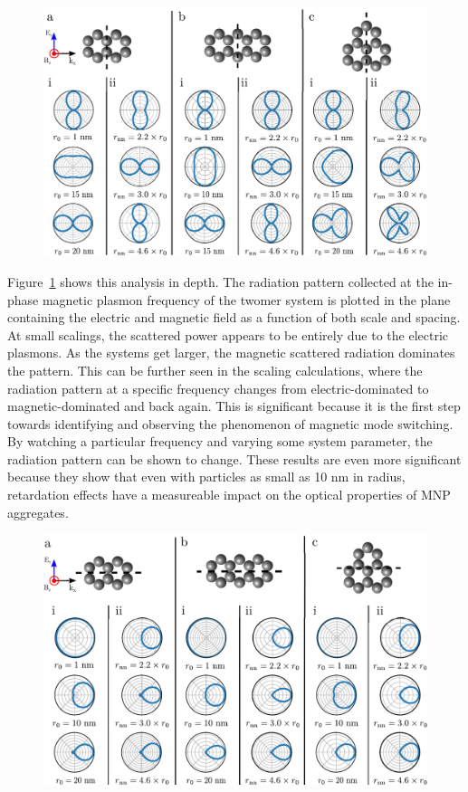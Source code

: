 \documentclass[journal=apchd5,manuscript=article]{achemso}
\begin{document}
\begin{figure}
\includegraphics[width=5in]{polar_plots_yz.pdf}
\label{polar_plots_yz}
\end{figure}

Figure~\ref{polar_plots_yz} shows this analysis in depth. The radiation pattern collected at the in-phase magnetic plasmon frequency of the twomer system is plotted in the plane containing the electric and magnetic field as a function of both scale and spacing. At small scalings, the scattered power appears to be entirely due to the electric plasmons. As the systems get larger, the magnetic scattered radiation dominates the pattern. This can be further seen in the scaling calculations, where the radiation pattern at a specific frequency changes from electric-dominated to magnetic-dominated and back again. This is significant because it is the first step towards identifying and observing the phenomenon of magnetic mode switching. By watching a particular frequency and varying some system parameter, the radiation pattern can be shown to change. These results are even more significant because they show that even with particles as small as 10 nm in radius, retardation effects have a measureable impact on the optical properties of MNP aggregates.

\begin{figure}
\includegraphics[width=5in]{beaming.pdf}
\label{polar_plots_xz}
\end{figure}
\end{document}
